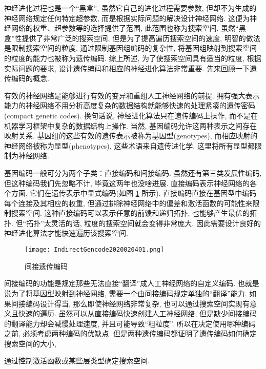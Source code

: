 \begin{remark}
神经进化过程也是一个“黑盒”, 虽然它自己的进化过程需要参数, 但却不为生成的神经网络规定任何特定超参数, 而是根据实际问题的解决设计神经网络. 这便为神经网络的权重、超参数等的选择提供了范围, 此范围也称为搜索空间. 虽然“黑盒”性提供了非常广泛的搜索空间, 但是为了提高遍历搜索空间的速度, 明智的做法是限制搜索空间的粒度. 通过限制基因组编码的复杂性, 将基因组映射到搜索空间的粒度的能力也被称为遗传编码. 综上所述, 为了使搜索空间具有适当的粒度, 根据实际问题的要求, 设计遗传编码和相应的神经进化算法非常重要. 先来回顾一下遗传编码的概念.

有效的神经网络是能够进行有效的变异和重组人工神经网络的前提. 拥有强大表示能力的神经网络不用分析高度复杂的数据结构就能够快速的处理紧凑的遗传密码(compact genetic codes).
换句话说, 神经进化算法只在遗传编码上操作, 而不是在机器学习框架中复杂的数据结构上操作. 当然, 基因编码允许这两种表示之间存在映射关系. 基因组的这些有效的遗传表示被称为基因型(genotypes), 而相应映射的神经网络被称为显型(phenotypes), 这些术语来自遗传进化学. 这里将所有显型都限制为神经网络.

基因编码一般可分为两个子类：直接编码和间接编码. 虽然还有第三类发展性编码, 但这种编码我们先忽略不计, 毕竟这两年也没啥进展. 直接编码表示神经网络的各个方面, 它们在遗传表示中显式编码(如图 \ref{IndirectGencode2020020401} 所示). 直接编码直接在基因型中编码每个连接及其相应的权重, 但通过排除神经网络中的偏差和激活函数的可能性来限制搜索空间.
这种直接编码可以表示任意的前馈和递归拓扑, 也能够产生最优的拓扑. 但“拓扑”太灵活的话, 粒度的搜索空间就会变得非常庞大. 因此需要设计良好的神经进化算法才能快速遍历该搜索空间.
\begin{figure}[H]
    \centering
    \texttt{[image: IndirectGencode2020020401.png]}
    \caption{间接遗传编码}
    \label{IndirectGencode2020020401}
\end{figure}

间接编码的功能是规定那些无法直接“翻译”成人工神经网络的自定义编码. 也就是说为了将基因型映射到神经网络, 需要一个由间接编码规定单独的“翻译”能力. 如果间接编码设计得当, 那么即使神经网络非常复杂, 也可以通过搜索空间实现有意义且快速的遍历.
虽然可以从直接编码快速创建人工神经网络, 但是缺少间接编码的翻译能力却会减慢处理速度, 并且可能导致“粗粒度”. 所以在决定使用哪种编码之前, 必须考虑两种编码的优缺点.
但是两种遗传编码都证明了遗传编码如何确定搜索空间的大小,
\begin{example}
    通过控制激活函数或某些层类型确定搜索空间.
\end{example}
\end{remark}


